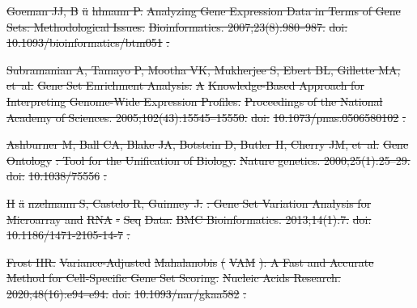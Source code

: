 \documentclass[10pt,letterpaper]{article}
\providecommand{\DIFdeltex}[1]{{\protect\color{red}\sout{#1}}}                      %
\providecommand{\DIFdel}[1]{\texorpdfstring{\DIFdeltex{#1}}{}} %
\begin{document}
\DIFdel{Goeman JJ, B}%
\DIFdel{\"u}%
\DIFdel{hlmann P.
}%
\DIFdel{Analyzing Gene Expression Data in Terms of Gene Sets: Methodological
  Issues.
}%
\DIFdel{Bioinformatics. 2007;23(8):980--987.
}%
\DIFdel{doi:}%
\DIFdel{10.1093/bioinformatics/btm051}%
\DIFdel{.
}%

\DIFdel{Subramanian A, Tamayo P, Mootha VK, Mukherjee S, Ebert BL, Gillette MA, et~al.
}%
\DIFdel{Gene Set Enrichment Analysis: }%
\DIFdel{A}%
\DIFdel{Knowledge-Based Approach for
  Interpreting Genome-Wide Expression Profiles.
}%
\DIFdel{Proceedings of the National Academy of Sciences.
  2005;102(43):15545--15550.
}%
\DIFdel{doi:}%
\DIFdel{10.1073/pnas.0506580102}%
\DIFdel{.
}%

\DIFdel{Ashburner M, Ball CA, Blake JA, Botstein D, Butler H, Cherry JM, et~al.
}%
\DIFdel{Gene }%
\DIFdel{Ontology}%
\DIFdel{: Tool for the Unification of Biology.
}%
\DIFdel{Nature genetics. 2000;25(1):25--29.
}%
\DIFdel{doi:}%
\DIFdel{10.1038/75556}%
\DIFdel{.
}%

\DIFdel{H}%
\DIFdel{\"a}%
\DIFdel{nzelmann S, Castelo R, Guinney J.
}%
\DIFdel{: Gene Set Variation Analysis for Microarray and
  }%
\DIFdel{RNA}%
\DIFdel{-}%
\DIFdel{Seq}%
\DIFdel{Data.
}%
\DIFdel{BMC Bioinformatics. 2013;14(1):7.
}%
\DIFdel{doi:}%
\DIFdel{10.1186/1471-2105-14-7}%
\DIFdel{.
}%

\DIFdel{Frost HR.
}%
\DIFdel{Variance-Adjusted }%
\DIFdel{Mahalanobis}%
\DIFdel{(}%
\DIFdel{VAM}%
\DIFdel{): A Fast and Accurate
  Method for Cell-Specific Gene Set Scoring.
}%
\DIFdel{Nucleic Acids Research. 2020;48(16):e94--e94.
}%
\DIFdel{doi:}%
\DIFdel{10.1093/nar/gkaa582}%
\DIFdel{.
}%
\end{document}
